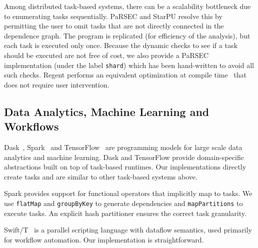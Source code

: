 Among distributed task-based systems, there can be a scalability
bottleneck due to enumerating tasks sequentially. PaRSEC and StarPU
resolve this by permitting the user to omit tasks that are not
directly connected in the dependence graph. The program is replicated
(for efficiency of the analysis), but each task is executed only
once. Because the dynamic checks to see if a task should be executed
are not free of cost, we also provide a PaRSEC implementation (under
the label \lstinline{shard}) which has been hand-written to avoid all
such checks. Regent performs an equivalent optimization at compile
time~\cite{ControlReplication17} that does not require user
intervention.

\subsection{Data Analytics, Machine Learning and Workflows}

Dask~\cite{Dask15}, Spark~\cite{Spark10} and
TensorFlow~\cite{TensorFlow15} are programming models for large scale
data analytics and machine learning. Dask and TensorFlow provide
domain-specific abstractions built on top of task-based runtimes. Our
implementations directly create tasks and are similar to other
task-based systems above.

Spark provides support for functional operators that implicitly map to
tasks. We use \lstinline[language=Scala]{flatMap} and
\lstinline[language=Scala]{groupByKey} to generate dependencies and
\lstinline[language=Scala]{mapPartitions} to execute tasks. An
explicit hash partitioner ensures the correct task granularity.

Swift/T~\cite{Wozniak13} is a parallel scripting language
with dataflow semantics, used primarily for workflow automation. Our
implementation is straightforward.
